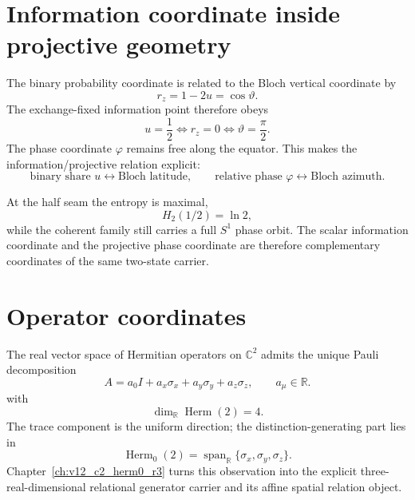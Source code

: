 \section{Information coordinate inside projective geometry}

The binary probability coordinate is related to the Bloch vertical coordinate by
\begin{equation}
r_z=1-2u=\cos\vartheta.
\end{equation}
The exchange-fixed information point therefore obeys
\begin{equation}
u=\frac12
\iff
r_z=0
\iff
\vartheta=\frac\pi2.
\end{equation}
The phase coordinate $\varphi$ remains free along the equator. This makes the information/projective relation explicit:
\begin{equation}
\boxed{
\text{binary share }u
\longleftrightarrow
\text{Bloch latitude},
\qquad
\text{relative phase }\varphi
\longleftrightarrow
\text{Bloch azimuth}.
}
\end{equation}

At the half seam the entropy is maximal,
\begin{equation}
H_2(1/2)=\ln2,
\end{equation}
while the coherent family still carries a full $S^1$ phase orbit. The scalar information coordinate and the projective phase coordinate are therefore complementary coordinates of the same two-state carrier.

\section{Operator coordinates}

The real vector space of Hermitian operators on $\mathbb C^2$ admits the unique Pauli decomposition
\begin{equation}
\boxed{
A=a_0I+a_x\sigma_x+a_y\sigma_y+a_z\sigma_z,
\qquad a_\mu\in\mathbb R.
}
\label{eq:v12_pauli_decomposition}
\end{equation}
with
\begin{equation}
\dim_{\mathbb R}\operatorname{Herm}(2)=4.
\end{equation}
The trace component is the uniform direction; the distinction-generating part lies in
\begin{equation}
\operatorname{Herm}_0(2)
=\operatorname{span}_{\mathbb R}\{\sigma_x,\sigma_y,\sigma_z\}.
\end{equation}
Chapter~\ref{ch:v12_c2_herm0_r3} turns this observation into the explicit three-real-dimensional relational generator carrier and its affine spatial relation object.

